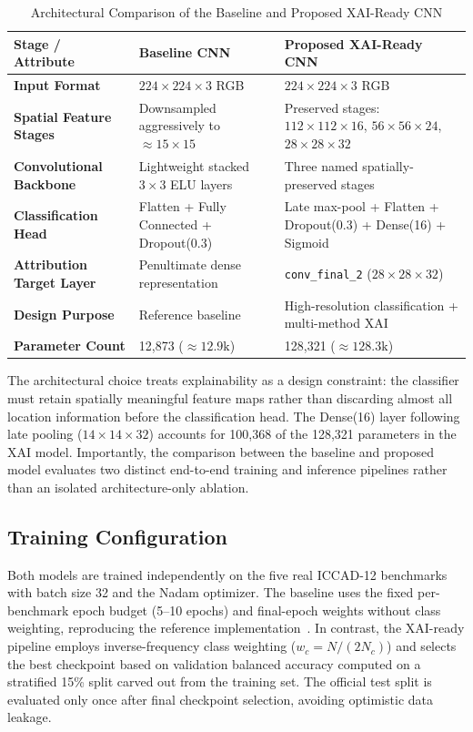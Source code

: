 \documentclass[conference]{IEEEtran}
\begin{document}
\begin{table}[t]
\caption{Architectural Comparison of the Baseline and Proposed XAI-Ready CNN}
\label{tab:architecture}
\centering
\setlength{\tabcolsep}{4pt}
\begin{tabular}{p{}p{}p{}}
\toprule
\textbf{Stage / Attribute} & \textbf{Baseline CNN} & \textbf{Proposed XAI-Ready CNN} \\
\midrule
\textbf{Input Format} & $224\times224\times3$ RGB & $224\times224\times3$ RGB \\
\textbf{Spatial Feature Stages} & Downsampled aggressively to $\approx 15\times15$ & Preserved stages: $112\times112\times16$, $56\times56\times24$, $28\times28\times32$ \\
\textbf{Convolutional Backbone} & Lightweight stacked $3\times3$ ELU layers & Three named spatially-preserved stages \\
\textbf{Classification Head} & Flatten + Fully Connected + Dropout(0.3) & Late max-pool + Flatten + Dropout(0.3) + Dense(16) + Sigmoid \\
\textbf{Attribution Target Layer} & Penultimate dense representation & \texttt{conv\_final\_2} ($28\times28\times32$) \\
\textbf{Design Purpose} & Reference baseline~\cite{verma2026} & High-resolution classification + multi-method XAI \\
\textbf{Parameter Count} & 12,873 ($\approx 12.9\text{k}$) & 128,321 ($\approx 128.3\text{k}$) \\
\bottomrule
\end{tabular}
\end{table}

The architectural choice treats explainability as a design constraint: the classifier must retain spatially meaningful feature maps rather than discarding almost all location information before the classification head. The Dense(16) layer following late pooling ($14\times14\times32$) accounts for 100,368 of the 128,321 parameters in the XAI model. Importantly, the comparison between the baseline and proposed model evaluates two distinct end-to-end training and inference pipelines rather than an isolated architecture-only ablation.

\subsection{Training Configuration}
Both models are trained independently on the five real ICCAD-12 benchmarks with batch size 32 and the Nadam optimizer. The baseline uses the fixed per-benchmark epoch budget (5--10 epochs) and final-epoch weights without class weighting, reproducing the reference implementation~\cite{verma2026}. In contrast, the XAI-ready pipeline employs inverse-frequency class weighting ($w_c = N / (2 N_c)$) and selects the best checkpoint based on validation balanced accuracy computed on a stratified 15\% split carved out from the training set. The official test split is evaluated only once after final checkpoint selection, avoiding optimistic data leakage.
\end{document}
